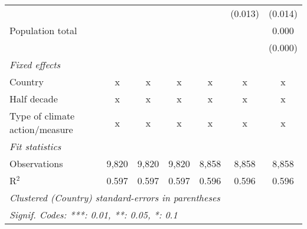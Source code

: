 \begin{tabular}{lcccccc}
                                                       &               &                &                &               & (0.013)       & (0.014)\\   
   Population total                                    &               &                &                &               &               & 0.000\\   
                                                       &               &                &                &               &               & (0.000)\\   
   \emph{Fixed effects}\\
   Country                                             & x             & x              & x              & x             & x             & x\\  
   Half decade                                         & x             & x              & x              & x             & x             & x\\  
   Type of climate action/measure                      & x             & x              & x              & x             & x             & x\\  
   \midrule \emph{Fit statistics}\\
   Observations                                        & 9,820         & 9,820          & 9,820          & 8,858         & 8,858         & 8,858\\  
   R$^2$                                               & 0.597         & 0.597          & 0.597          & 0.596         & 0.596         & 0.596\\  
   \midrule
   \multicolumn{7}{l}{\emph{Clustered (Country) standard-errors in parentheses}}\\
   \multicolumn{7}{l}{\emph{Signif. Codes: ***: 0.01, **: 0.05, *: 0.1}}\\
\end{tabular}
\par\endgroup


